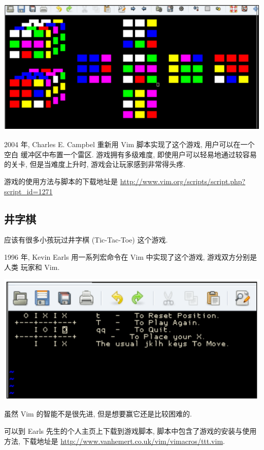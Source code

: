 \begin{center}
    \includegraphics[scale=0.6]{./images/page203-2.png}
\end{center}

2004 年, Charles E. Campbel 重新用 Vim 脚本实现了这个游戏, 用户可以在一个空白
缓冲区中布置一个雷区. 游戏拥有多级难度, 即使用户可以轻易地通过较容易的关卡,
但是当难度上升时, 游戏会让玩家感到非常得头疼.

游戏的使用方法与脚本的下载地址是
\url{http://www.vim.org/scripts/script.php?script_id=1271}

\subsection{井字棋}
\label{subsec:tic_tac_toe}
应该有很多小孩玩过井字棋 (Tic-Tac-Toe) 这个游戏.

1996 年, Kevin Earls 用一系列宏命令在 Vim 中实现了这个游戏, 游戏双方分别是人类
玩家和 Vim.

\begin{center}
    \includegraphics[scale=0.8]{./images/page204.png}
\end{center}

虽然 Vim 的智能不是很先进, 但是想要赢它还是比较困难的.

可以到 Earls 先生的个人主页上下载到游戏脚本, 脚本中包含了游戏的安装与使用方法,
下载地址是 \url{http://www.vanhemert.co.uk/vim/vimacros/ttt.vim}.

